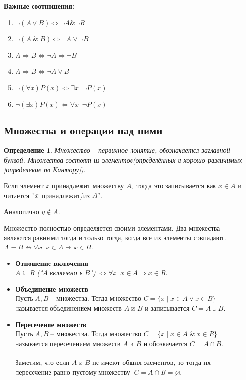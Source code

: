 \documentclass{article}
\newtheorem{Definition}{Определение}[section]
\begin{document}
{\bf Важные соотношения:}

\begin{enumerate}
\item $\neg(A\vee B) \Leftrightarrow \neg A \& \neg B$
\item $\neg(A\;\&\; B)\Leftrightarrow \neg A\vee\neg B$
\item $A \Rightarrow B  \Leftrightarrow \neg A\Rightarrow\neg B$
\item $A\Rightarrow B  \Leftrightarrow\neg A\vee B$
\item $\neg \left(\forall x\right) P(x) \Leftrightarrow \exists x \;\;\neg P(x)$
\item $\neg \left(\exists x\right) P(x) \Leftrightarrow \forall x \;\;\neg P(x)$
\end{enumerate}

\subsection{Множества и операции над ними}

\begin{Definition}
Множество -- первичное понятие, обозначается заглавной буквой. Множества состоят из элементов(определённых и хорошо различимых [определение по Кантору]).
\end{Definition}

Если элемент $x$ принадлежит множеству $A,$ тогда это записывается как $x\in A$ и читается $"x$ принадлежит/из $A".$

Аналогично $y\notin A.$

Множество полностью определяется своими элементами. Два множества являются равными тогда и только тогда, когда все их элементы совпадают.\\ $A=B \Leftrightarrow \forall x\;\; x\in A \Rightarrow x\in B.$

\begin{itemize}
\item {\bf Отношение включения}\\
$A\subseteq B$ \textit{ ("$A$ включено в $B$")} $\Leftrightarrow \forall x\;\; x\in A \Rightarrow x\in B.$

\item {\bf Объединение множеств}\\
Пусть $A, B$ -- множества. Тогда множество $C=\{x\mid x\in A \vee x\in B\}$ называется объединением множеств $A$ и $B$ и записывается $C=A\cup B.$

\item {\bf Пересечение множеств}\\
Пусть $A, B$ -- множества. Тогда множество $C=\{x\mid x\in A\;\&\; x\in B\}$ называется пересечением множеств $A$ и $B$ и обозначается $C=A\cap B.$\\
\\Заметим, что если $A$ и $B$ не имеют общих элементов, то тогда их пересечение равно пустому множеству: $C=A\cap B=\varnothing.$
\end{itemize}
\end{document}
